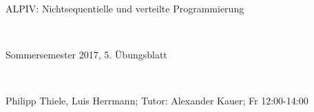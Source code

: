 \documentclass[numbers=noendperiod]{scrartcl}
\begin{document}
	
	
\hrulefill
\begin{center}
	\bfseries %
	\sffamily %
	\begin{huge}
		ALPIV: Nichtsequentielle und verteilte Programmierung
	\end{huge}\\
	\begin{Large}
		Sommersemester 2017, 5. Übungsblatt
	\end{Large}\\
	\begin{small}
		Philipp Thiele, Luis Herrmann; Tutor: Alexander Kauer; Fr 12:00-14:00
	\end{small}
	
	\vspace{-10pt}
\end{center}
\hrulefill

\newcommand{\inputmintedframed}[2]{
	\begin{mdframed}[linecolor=bg,backgroundcolor=bg]
		\inputminted[mathescape,breaklines,linenos,numbersep=5pt,tabsize=3]{#1}{#2}
\end{mdframed}}
\end{document}
